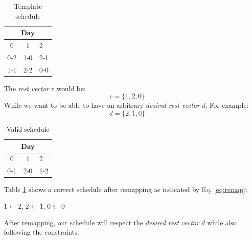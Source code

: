 \documentclass[a4paper, 10pt]{article}
\begin{document}
\begin{minipage}[t]{0.45\linewidth}
    \begin{table}[H]
	    \centering
	    \begin{tabular}{ccl}
		\multicolumn{3}{c}{Day}                                 \\ \hline
		\multicolumn{1}{c}{0}  & \multicolumn{1}{c}{1}  & 2     \\ \hline
		0-2                     & 1-0                     & 2-1 \\
		\multicolumn{1}{l}{1-1} & \multicolumn{1}{l}{2-2} & 0-0 \\
		\hline
	    \end{tabular}
	\caption{Template schedule}
    \end{table}
    The \textit{rest vector} $r$ would be:
    \begin{equation*}
	r = \{1, 2, 0\}
    \end{equation*}
    While we want to be able to have an arbitrary \textit{desired rest vector} $d$. For example:
    \begin{equation*}
	d = \{2, 1, 0\}
    \end{equation*}
\end{minipage} \hfill
\begin{minipage}[t]{0.45\linewidth}
    \begin{table}[H]
	    \centering
	    \begin{tabular}{ccl}
		\multicolumn{3}{c}{Day}                                 \\ \hline
		\multicolumn{1}{c}{0}  & \multicolumn{1}{c}{1}  & 2   \\ \hline
		0-1                     & 2-0                     & 1-2 \\
		\hline
	    \end{tabular}
	\caption{Valid schedule}
	\label{table:remap}
    \end{table}
    Table \ref{table:remap} shows a correct schedule after remapping as indicated by Eq. \ref{eq:remap}: 

    \begin{center}
    $1 \leftarrow 2$, $2 \leftarrow 1$, $0 \leftarrow 0$
    \end{center}

    After remapping, our schedule will respect the \textit{desired rest vector} $d$ while also following the constraints.

\end{minipage}
\end{document}
